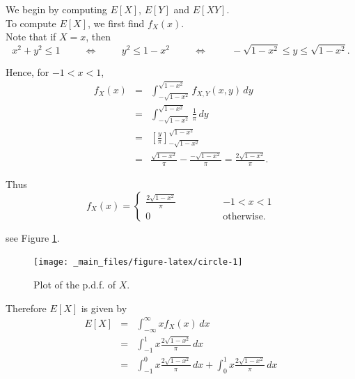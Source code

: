 \documentclass[
]{book}
\begin{document}
We begin by computing \(E[X]\), \(E[Y]\) and \(E[XY]\).\\
To compute \(E[X]\), we first find \(f_X (x)\).\\
Note that if \(X=x\), then\\

\[ x^2 + y^2 \leq 1 \hspace{1cm} \Leftrightarrow \hspace{1cm} y^2 \leq 1-x^2 \hspace{1cm} \Leftrightarrow \hspace{1cm} 
- \sqrt{1-x^2} \leq y \leq \sqrt{1-x^2}. \]

Hence, for \(-1 < x< 1\),\\

\begin{eqnarray*}
f_X (x) &=& \int_{-\sqrt{1-x^2}}^{\sqrt{1-x^2}} f_{X,Y} (x,y) \, dy  \\
&=& \int_{-\sqrt{1-x^2}}^{\sqrt{1-x^2}} \frac{1}{\pi} \, dy  \\
&=& \left[ \frac{y}{\pi} \right]_{-\sqrt{1-x^2}}^{\sqrt{1-x^2}} \\
&=& \frac{\sqrt{1-x^2}}{\pi} - \frac{-\sqrt{1-x^2}}{\pi} = \frac{2 \sqrt{1- x^2}}{\pi}. \end{eqnarray*}

Thus\\

\[ f_X (x) = \left\{ \begin{array}{ll}  \frac{2 \sqrt{1- x^2}}{\pi} \qquad \qquad & -1 < x < 1 \\ 0 & \mbox{otherwise}. \end{array} \right.  \]

see Figure \ref{fig:circle}.\\

\begin{figure}
\texttt{[image: \_main\_files/figure-latex/circle-1]} \caption{Plot of the p.d.f. of $X$.}\label{fig:circle}
\end{figure}

Therefore \(E[X]\) is given by\\

\begin{eqnarray*}
E[X] &=& \int_{-\infty}^\infty x f_X (x) \, dx \\
&=& \int_{-1}^1 x  \frac{2 \sqrt{1- x^2}}{\pi} \, dx \\
&=& \int_{-1}^0 x  \frac{2 \sqrt{1- x^2}}{\pi} \, dx  +  \int_0^1 x  \frac{2 \sqrt{1- x^2}}{\pi} \, dx \end{eqnarray*}
\end{document}
